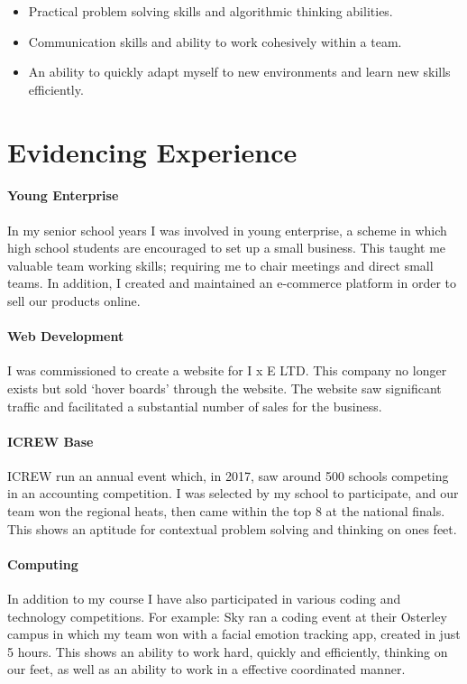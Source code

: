 \documentclass[9pt,a4paper]{article}
\begin{document}
\begin{multicols*}{2}
\begin{itemize}
\item Practical problem solving skills and algorithmic thinking abilities.

\item Communication skills and ability to work cohesively within a team.

\item An ability to quickly adapt myself to new environments and learn new skills efficiently.
\end{itemize}

\section*{Evidencing Experience}
\paragraph{Young Enterprise}
In my senior school years I was involved in young enterprise, a scheme in which high school students are encouraged to set up a small business.
This taught me valuable team working skills; requiring me to chair meetings and direct small teams.
In addition, I created and maintained an e-commerce platform in order to sell our products online.

\paragraph{Web Development}
I was commissioned to create a website for I x E LTD.
This company no longer exists but sold `hover boards' through the website.
The website saw significant traffic and facilitated a substantial number of sales for the business.

\paragraph{ICREW Base}
ICREW run an annual event which, in 2017, saw around 500 schools competing in an accounting competition.
I was selected by my school to participate, and our team won the regional heats, then came within the top 8 at the national finals.
This shows an aptitude for contextual problem solving and thinking on ones feet.

\paragraph{Computing}
In addition to my course I have also participated in various coding and technology competitions.
For example: Sky ran a coding event at their Osterley campus in which my team won with a facial emotion tracking app, created in just 5 hours.
This shows an ability to work hard, quickly and efficiently, thinking on our feet, as well as an ability to work in a effective coordinated manner.


\end{multicols*}
\end{document}
